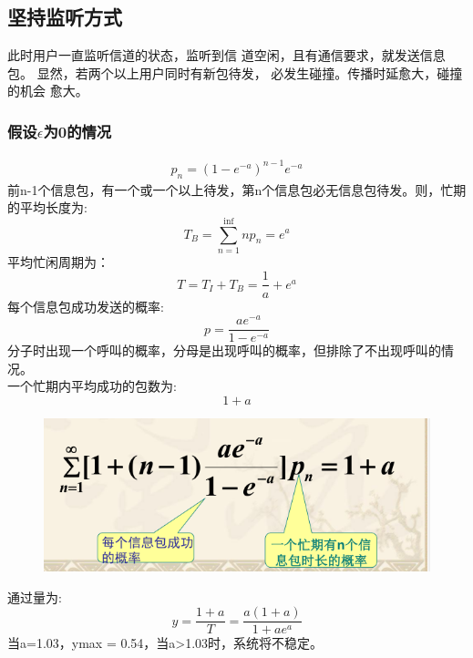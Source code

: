 \subsection{坚持监听方式}
此时用户一直监听信道的状态，监听到信
道空闲，且有通信要求，就发送信息包。
显然，若两个以上用户同时有新包待发，
必发生碰撞。传播时延愈大，碰撞的机会
愈大。\\
\subsubsection{假设$\epsilon$为0的情况}
\begin{gather}
p_n = (1-e^{-a})^{n-1}e^{-a}
\end{gather}
前n-1个信息包，有一个或一个以上待发，第n个信息包必无信息包待发。则，忙期的平均长度为:
\begin{equation}\label{key}
T_B = \sum_{n=1}^{\inf}np_n = e^a
\end{equation}
 平均忙闲周期为：\begin{equation}\label{key}
 T = T_I+T_B = \frac{1}{a}+e^a
 \end{equation}
 每个信息包成功发送的概率:
 \begin{equation}\label{key}
 p = \frac{ae^{-a}}{1-e^{-a}}
 \end{equation}
 分子时出现一个呼叫的概率，分母是出现呼叫的概率，但排除了不出现呼叫的情况。\\
 
 一个忙期内平均成功的包数为:
 \begin{equation}\label{key}
  1+a
 \end{equation}
\begin{figure}[H]
	\centering
	\includegraphics[width=0.7\linewidth]{figures/screenshot012}
	\caption{}
	\label{fig:screenshot012}
\end{figure}
通过量为:
\begin{equation}\label{key}
y = \frac{1+a}{T} = \frac{a(1+a)}{1+ae^a}
\end{equation}
当a=1.03，ymax = 0.54，当a>1.03时，系统将不稳定。
